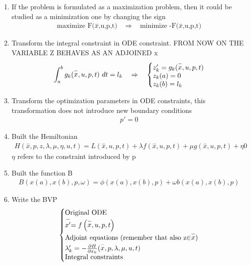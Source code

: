 \documentclass[a4paper,12pt]{article}
\makeatletter
\newenvironment{sistema}%
{\left\lbrace\begin{array}{@{}l@{}}}%
	{\end{array}\right.}
\makeatother
\begin{document}
	\begin{enumerate}
		\item If the problem is formulated as a maximization problem, then it could be studied as a minimization one by changing the sign
		\begin{gather}
			\text{maximize F($\stackrel{-}{x}$,u,p,t)} \ \ \ \  \Rightarrow \ \ \ \ \text{minimize -F($\stackrel{-}{x}$,u,p,t)}
		\end{gather}
		\item Transform the integral constraint in ODE constraint. FROM NOW ON THE VARIABLE Z BEHAVES AS AN ADJOINED x
		\begin{gather}
			\int_{a}^{b}g_k(\stackrel{-}{x},u,p,t) \ dt = l_k \ \ \ \Rightarrow \ \ \
			\begin{sistema}
				z'_k=g_k(\stackrel{-}{x},u,p,t)\\
				z_k(a)=0\\
				z_k(b)=l_k
			\end{sistema}
		\end{gather}
		\item Transform the optimization parameters in ODE constraints, this transformation does not introduce new boundary conditions
		\begin{gather}
			p' = 0
		\end{gather}
		\item Built the Hemiltonian
		\begin{gather}
			H(\stackrel{-}{x},p,z,\lambda, \mu,\eta,u,t)=L(\stackrel{-}{x},u,p,t)+\lambda f(\stackrel{-}{x},u,p,t)+\mu g(\stackrel{-}{x},u,p,t)+\eta 0
		\end{gather}
		$\eta$ refers to the constraint introduced by p
		\item Built the function B
		\begin{gather}
			B(x(a),x(b),p,\omega)=\phi\left(x(a),x(b),p \right)+\omega b\left(x(a),x(b),p\right)
		\end{gather} 
		\item Write the BVP
		\begin{gather}
			\begin{sistema}
				\text{Original ODE}\\
				\stackrel{-}{x'}=f\left(\stackrel{-}{x},u,p,t \right)\\
				\text{Adjoint equations (remember that also z$\in \stackrel{-}{x}$)}\\
				\lambda_k '=-\frac{\partial H}{\partial x_k }(\stackrel{-}{x},p,\lambda,\mu,u,t)\\
				\text{Integral constraints}\\

\end{sistema}
\end{gather}
\end{enumerate}
\end{document}
